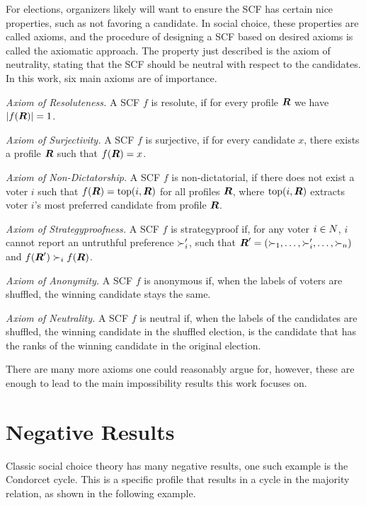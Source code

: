 For elections, organizers likely will want to ensure the SCF has certain
nice properties, such as not favoring a candidate. In social choice, these
properties are called axioms, and the procedure of designing a SCF based on
desired axioms is called the axiomatic approach. The property just
described is the axiom of neutrality, stating that the SCF should be
neutral with respect to the candidates. In this work, six main axioms are of
importance.

\emph{Axiom of Resoluteness.} A SCF $f$ is resolute, if for every profile
$\boldsymbol{R}$ we have $|f(\boldsymbol{R})| = 1$.

\emph{Axiom of Surjectivity.} A SCF $f$ is surjective, if for every candidate
$x$, there exists a profile $\boldsymbol{R}$ such that
$f(\boldsymbol{R}) = x$.

\emph{Axiom of Non-Dictatorship.} A SCF $f$ is non-dictatorial, if there does not exist a voter $i$ such that $f(\boldsymbol{R}) = \textnormal{top}(i,\boldsymbol{R})$ for all profiles $\boldsymbol{R}$, where $\textnormal{top}(i,\boldsymbol{R})$  extracts voter $i$'s most preferred candidate from profile $\boldsymbol{R}$.

\emph{Axiom of Strategyproofness.} A SCF $f$ is strategyproof if, for any
voter $i \in N$, $i$ cannot report an untruthful preference
$\succ_i'$, such that  $\boldsymbol{R}' = (\succ_{1}, \dots,
	\succ_{i}', \dots, \succ_{n})$ and $f(\boldsymbol{R}') \succ_i
	f(\boldsymbol{R})$.

\emph{Axiom of Anonymity.} A SCF $f$ is anonymous if, when the labels of voters
are shuffled, the winning candidate stays the same.

\emph{Axiom of Neutrality.} A SCF $f$ is neutral if, when the labels of the
candidates are shuffled, the winning candidate in the shuffled election, is
the candidate that has the ranks of the winning candidate in the original
election.

There are many more axioms one could reasonably argue for, however, these are
enough to lead to the main impossibility results this work focuses on.

\section{Negative Results}
\label{preliminaries: negative results}

Classic social choice theory has many negative results, one such example is the
Condorcet cycle. This is a specific profile that results in a cycle in the
majority relation, as shown in the following example.

